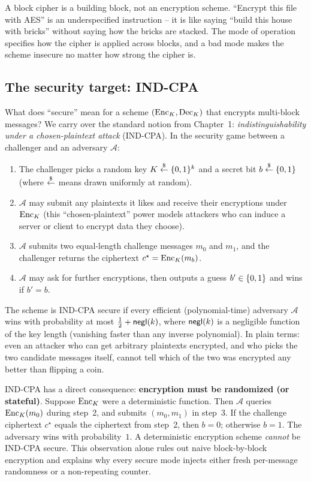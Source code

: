 \begin{focusbox}
A block cipher is a building block, not an encryption scheme. ``Encrypt this file with AES'' is an underspecified instruction -- it is like saying ``build this house with bricks'' without saying how the bricks are stacked. The mode of operation specifies how the cipher is applied across blocks, and a bad mode makes the scheme insecure no matter how strong the cipher is.
\end{focusbox}

\subsection{The security target: IND-CPA}

What does ``secure'' mean for a scheme $(\operatorname{Enc}_K, \operatorname{Dec}_K)$ that encrypts multi-block messages? We carry over the standard notion from Chapter~1: \emph{indistinguishability under a chosen-plaintext attack} (IND-CPA). In the security game between a challenger and an adversary $\mathcal{A}$:

\begin{enumerate}
\item The challenger picks a random key $K \stackrel{\$}{\gets} \{0,1\}^k$ and a secret bit $b \stackrel{\$}{\gets} \{0,1\}$ (where $\stackrel{\$}{\gets}$ means drawn uniformly at random).
\item $\mathcal{A}$ may submit any plaintexts it likes and receive their encryptions under $\operatorname{Enc}_K$ (this ``chosen-plaintext'' power models attackers who can induce a server or client to encrypt data they choose).
\item $\mathcal{A}$ submits two equal-length challenge messages $m_0$ and $m_1$, and the challenger returns the ciphertext $c^\star = \operatorname{Enc}_K(m_b)$.
\item $\mathcal{A}$ may ask for further encryptions, then outputs a guess $b' \in \{0,1\}$ and wins if $b' = b$.
\end{enumerate}

The scheme is IND-CPA secure if every efficient (polynomial-time) adversary $\mathcal{A}$ wins with probability at most $\tfrac{1}{2} + \mathsf{negl}(k)$, where $\mathsf{negl}(k)$ is a negligible function of the key length (vanishing faster than any inverse polynomial). In plain terms: even an attacker who can get arbitrary plaintexts encrypted, and who picks the two candidate messages itself, cannot tell which of the two was encrypted any better than flipping a coin.

\begin{whybox}
IND-CPA has a direct consequence: \textbf{encryption must be randomized (or stateful)}. Suppose $\operatorname{Enc}_K$ were a deterministic function. Then $\mathcal{A}$ queries $\operatorname{Enc}_K(m_0)$ during step~2, and submits $(m_0, m_1)$ in step~3. If the challenge ciphertext $c^\star$ equals the ciphertext from step~2, then $b = 0$; otherwise $b = 1$. The adversary wins with probability~$1$. A deterministic encryption scheme \emph{cannot} be IND-CPA secure. This observation alone rules out naive block-by-block encryption and explains why every secure mode injects either fresh per-message randomness or a non-repeating counter.
\end{whybox}

